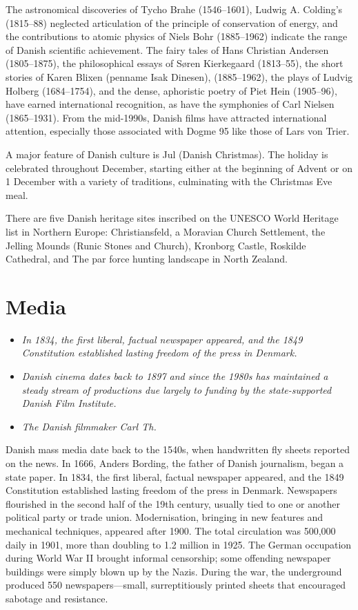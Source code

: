 The astronomical discoveries of Tycho Brahe (1546--1601), Ludwig A.
Colding's (1815--88) neglected articulation of the principle of
conservation of energy, and the contributions to atomic physics of Niels
Bohr (1885--1962) indicate the range of Danish scientific achievement.
The fairy tales of Hans Christian Andersen (1805--1875), the
philosophical essays of Søren Kierkegaard (1813--55), the short stories
of Karen Blixen (penname Isak Dinesen), (1885--1962), the plays of
Ludvig Holberg (1684--1754), and the dense, aphoristic poetry of Piet
Hein (1905--96), have earned international recognition, as have the
symphonies of Carl Nielsen (1865--1931). From the mid-1990s, Danish
films have attracted international attention, especially those
associated with Dogme 95 like those of Lars von Trier.

A major feature of Danish culture is Jul (Danish Christmas). The holiday
is celebrated throughout December, starting either at the beginning of
Advent or on 1 December with a variety of traditions, culminating with
the Christmas Eve meal.

There are five Danish heritage sites inscribed on the UNESCO World
Heritage list in Northern Europe: Christiansfeld, a Moravian Church
Settlement, the Jelling Mounds (Runic Stones and Church), Kronborg
Castle, Roskilde Cathedral, and The par force hunting landscape in North
Zealand.

\section{Media}\label{media}

\begin{itemize}
\item
  \emph{In 1834, the first liberal, factual newspaper appeared, and the
  1849 Constitution established lasting freedom of the press in
  Denmark.}
\item
  \emph{Danish cinema dates back to 1897 and since the 1980s has
  maintained a steady stream of productions due largely to funding by
  the state-supported Danish Film Institute.}
\item
  \emph{The Danish filmmaker Carl Th.}
\end{itemize}

Danish mass media date back to the 1540s, when handwritten fly sheets
reported on the news. In 1666, Anders Bording, the father of Danish
journalism, began a state paper. In 1834, the first liberal, factual
newspaper appeared, and the 1849 Constitution established lasting
freedom of the press in Denmark. Newspapers flourished in the second
half of the 19th century, usually tied to one or another political party
or trade union. Modernisation, bringing in new features and mechanical
techniques, appeared after 1900. The total circulation was 500,000 daily
in 1901, more than doubling to 1.2 million in 1925. The German
occupation during World War II brought informal censorship; some
offending newspaper buildings were simply blown up by the Nazis. During
the war, the underground produced 550 newspapers---small,
surreptitiously printed sheets that encouraged sabotage and resistance.

